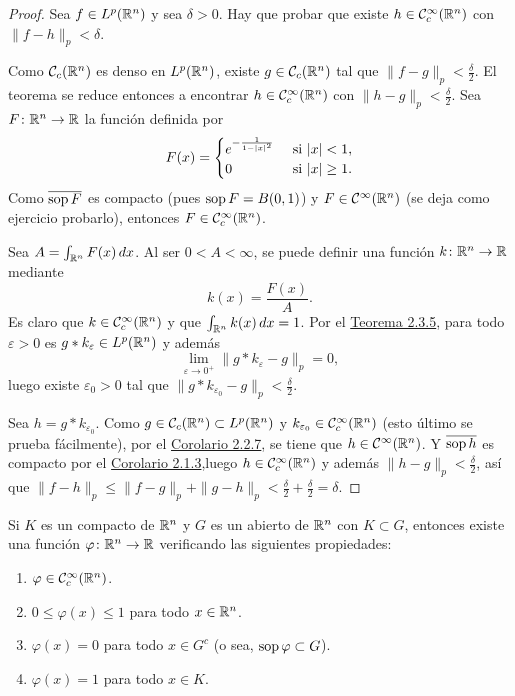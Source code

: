 \documentclass[a4paper, 11pt, oneside]{report}
\begin{document}
\begin{proof}
  Sea $f \in L^p(\mathbb R^n)$ y sea $\delta > 0$. Hay que probar que existe $h \in \mathcal{C}^\infty_c(\mathbb R^n)$ con $\|f-h\|_p < \delta$. 
  
  Como $\mathcal{C}_c(\mathbb R^n)$ es denso en $L^p(\mathbb R^n)$, existe $g \in \mathcal{C}_c(\mathbb R^n)$ tal que $\|f - g\|_p < \frac{\delta}{2}$. El teorema se reduce entonces a encontrar $h \in \mathcal{C}^\infty_c(\mathbb R^n)$ con $\|h - g\|_p < \frac{\delta}{2}$. Sea $F \colon \mathbb R^n \to \mathbb R$ la función definida por
  \[F(x)=\begin{cases}
    e^{-\frac{1}{1-|x|^2}} & $ si $ |x| < 1, \\
    0 & $ si $ |x| \geq 1.
  \end{cases}\]
  Como $\overline{\textup{sop}\, F}$ es compacto (pues $\textup{sop}\, F = B(0,1)$) y $F \in \mathcal{C}^\infty(\mathbb R^n)$ (se deja como ejercicio probarlo), entonces $F \in \mathcal{C}^\infty_c(\mathbb R^n)$. 
  
  Sea $A = \int_{\mathbb R^n} F(x) \, dx$. Al ser $0 < A < \infty$, se puede definir una función $k \colon \mathbb R^n \to \mathbb R$ mediante \[k(x)=\frac{F(x)}{A}.\] Es claro que $k \in \mathcal{C}^\infty_c(\mathbb R^n)$ y que $\int_{\mathbb R^n} k(x) \, dx = 1$. Por el \hyperref[teo:2.3.5]{\color{c1}Teorema 2.3.5}, para todo $\varepsilon > 0$ es $g \ast k_\varepsilon \in L^p(\mathbb R^n)$ y además
  \[\lim_{\varepsilon \to 0^+} \|g \ast k_\varepsilon - g\|_p = 0,\]
  luego existe $\varepsilon_0 > 0$ tal que $\|g \ast k_{\varepsilon_0} - g\|_p < \frac{\delta}{2}$. 
  
  Sea $h = g \ast k_{\varepsilon_0}$. Como $g \in \mathcal{C}_c(\mathbb R^n) \subset L^p(\mathbb R^n)$ y $k_{\varepsilon_0} \in \mathcal{C}^\infty_c(\mathbb R^n)$ (esto último se prueba fácilmente), por el \hyperref[cor:2.2.7]{\color{c1}Corolario 2.2.7}, se tiene que $h \in \mathcal{C}^\infty(\mathbb R^n)$. Y $\overline{\textup{sop}\, h}$ es compacto por el \hyperref[cor:2.1.3]{\color{c1}Corolario 2.1.3},luego $h \in \mathcal{C}^\infty_c(\mathbb R^n)$ y además $\|h-g\|_p < \frac{\delta}{2}$, así que $\|f - h\|_p \leq \|f - g\|_p+\|g-h\|_p < \frac{\delta}{2}+\frac{\delta}{2} = \delta$.
\end{proof}

\begin{theorem}
  Si $K$ es un compacto de $\mathbb R^n$ y $G$ es un abierto de $\mathbb R^n$ con $K \subset G$, entonces existe una función $\varphi \colon \mathbb R^n \to \mathbb R$ verificando las siguientes propiedades:
  \begin{enumerate}
    \item $\varphi \in \mathcal{C}^\infty_c(\mathbb R^n)$.
    \item $0 \leq \varphi(x) \leq 1$ para todo $x \in \mathbb R^n$.
    \item $\varphi(x)=0$ para todo $x \in G^c$ (o sea, $\textup{sop}\, \varphi \subset G$).
    \item $\varphi(x)=1$ para todo $x \in K$.
  \end{enumerate}
\end{theorem}
\end{document}
